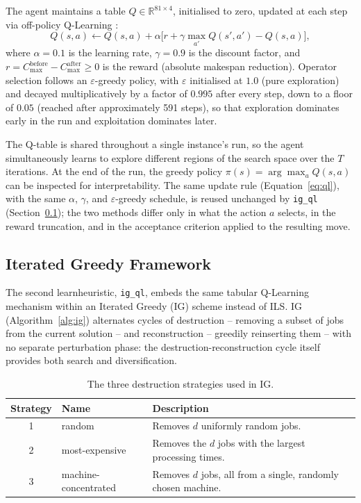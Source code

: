 \documentclass[final,3p,times,11pt,authoryear]{elsarticle}
\begin{document}
The agent maintains a table $Q \in \mathbb{R}^{81 \times 4}$,
initialised to zero, updated at each step via off-policy Q-Learning
\citep{WatkinsDayan1992}:
\begin{equation}
  Q(s,a) \leftarrow Q(s,a) + \alpha \bigl[
    r + \gamma \max_{a'} Q(s', a') - Q(s,a)
  \bigr],
  \label{eq:ql}
\end{equation}
where $\alpha = 0.1$ is the learning rate, $\gamma = 0.9$ is the
discount factor, and $r = C_{\max}^{\mathrm{before}} -
C_{\max}^{\mathrm{after}} \geq 0$ is the reward (absolute makespan
reduction).
Operator selection follows an $\varepsilon$-greedy policy, with
$\varepsilon$ initialised at $1.0$ (pure exploration) and decayed
multiplicatively by a factor of $0.995$ after every step, down to a
floor of $0.05$ (reached after approximately 591 steps), so that
exploration dominates early in the run and exploitation dominates
later.

The Q-table is shared throughout a single instance's run, so the agent
simultaneously learns to explore different regions of the search space
over the $T$ iterations.
At the end of the run, the greedy policy $\pi(s) = \arg\max_a Q(s,a)$
can be inspected for interpretability.
The same update rule (Equation~\ref{eq:ql}), with the same $\alpha$,
$\gamma$, and $\varepsilon$-greedy schedule, is reused unchanged by
\texttt{ig\_ql} (Section~\ref{sec:ig}); the two methods differ only in
what the action $a$ selects, in the reward truncation, and in the
acceptance criterion applied to the resulting move.

\subsection{Iterated Greedy Framework}
\label{sec:ig}

The second learnheuristic, \texttt{ig\_ql}, embeds the same tabular
Q-Learning mechanism within an Iterated Greedy (IG) scheme instead of
ILS. IG (Algorithm~\ref{alg:ig}) alternates cycles of destruction --
removing a subset of jobs from the current solution -- and
reconstruction -- greedily reinserting them -- with no separate
perturbation phase: the destruction-reconstruction cycle itself
provides both search and diversification.

\begin{table}[ht]
\centering
\caption{The three destruction strategies used in IG.}
\label{tab:destroy}
\begin{tabular}{@{}clp{7.5cm}@{}}
\toprule
\textbf{Strategy} & \textbf{Name} & \textbf{Description} \\
\midrule
1 & random               & Removes $d$ uniformly random jobs. \\
2 & most-expensive       & Removes the $d$ jobs with the largest processing times. \\
3 & machine-concentrated & Removes $d$ jobs, all from a single, randomly chosen machine. \\
\bottomrule
\end{tabular}
\end{table}
\end{document}

